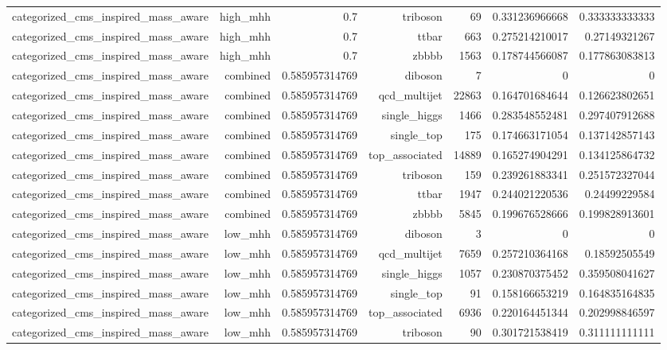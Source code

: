 \begin{table}[htbp]
{\begin{tabular}{lrrrrrr}
categorized\_cms\_inspired\_mass\_aware & high\_mhh & 0.7 & triboson & 69 & 0.331236966668 & 0.333333333333 \\
categorized\_cms\_inspired\_mass\_aware & high\_mhh & 0.7 & ttbar & 663 & 0.275214210017 & 0.27149321267 \\
categorized\_cms\_inspired\_mass\_aware & high\_mhh & 0.7 & zbbbb & 1563 & 0.178744566087 & 0.177863083813 \\
categorized\_cms\_inspired\_mass\_aware & combined & 0.585957314769 & diboson & 7 & 0 & 0 \\
categorized\_cms\_inspired\_mass\_aware & combined & 0.585957314769 & qcd\_multijet & 22863 & 0.164701684644 & 0.126623802651 \\
categorized\_cms\_inspired\_mass\_aware & combined & 0.585957314769 & single\_higgs & 1466 & 0.283548552481 & 0.297407912688 \\
categorized\_cms\_inspired\_mass\_aware & combined & 0.585957314769 & single\_top & 175 & 0.174663171054 & 0.137142857143 \\
categorized\_cms\_inspired\_mass\_aware & combined & 0.585957314769 & top\_associated & 14889 & 0.165274904291 & 0.134125864732 \\
categorized\_cms\_inspired\_mass\_aware & combined & 0.585957314769 & triboson & 159 & 0.239261883341 & 0.251572327044 \\
categorized\_cms\_inspired\_mass\_aware & combined & 0.585957314769 & ttbar & 1947 & 0.244021220536 & 0.24499229584 \\
categorized\_cms\_inspired\_mass\_aware & combined & 0.585957314769 & zbbbb & 5845 & 0.199676528666 & 0.199828913601 \\
categorized\_cms\_inspired\_mass\_aware & low\_mhh & 0.585957314769 & diboson & 3 & 0 & 0 \\
categorized\_cms\_inspired\_mass\_aware & low\_mhh & 0.585957314769 & qcd\_multijet & 7659 & 0.257210364168 & 0.18592505549 \\
categorized\_cms\_inspired\_mass\_aware & low\_mhh & 0.585957314769 & single\_higgs & 1057 & 0.230870375452 & 0.359508041627 \\
categorized\_cms\_inspired\_mass\_aware & low\_mhh & 0.585957314769 & single\_top & 91 & 0.158166653219 & 0.164835164835 \\
categorized\_cms\_inspired\_mass\_aware & low\_mhh & 0.585957314769 & top\_associated & 6936 & 0.220164451344 & 0.202998846597 \\
categorized\_cms\_inspired\_mass\_aware & low\_mhh & 0.585957314769 & triboson & 90 & 0.301721538419 & 0.311111111111 \\

\end{tabular}}
\end{table}
